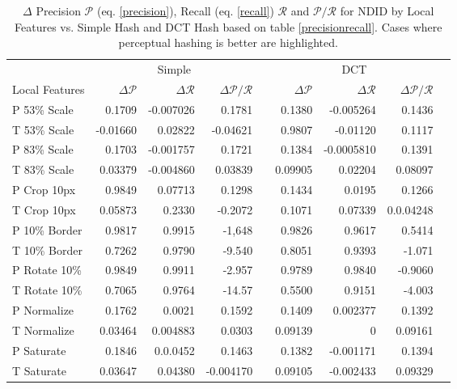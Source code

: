 \documentclass[english,12pt,a4paper,pdftex,elec,utf8, table]{aaltothesis}
\begin{document}
\begin{table} \footnotesize
\caption{ $\Delta$ Precision $\mathcal{P}$ (eq. \ref{precision}), Recall (eq. \ref{recall}) $\mathcal{R}$ and $\mathcal{P}/\mathcal{R}$ for NDID by Local Features vs. Simple Hash and DCT Hash based on table \ref{precisionrecall}. Cases where perceptual hashing is better are highlighted.}
\label{deltaprecisionrecall}
\begin{center}
  \setlength\tabcolsep{3pt} %
  \begin{tabular}{@{}lrrrrrrrr@{}}
    \toprule
    & \multicolumn{3}{c}{Simple} &\phantom{abc} &\multicolumn{3}{c}{DCT} &\phantom{abc}\\
\cmidrule{2-4} \cmidrule{6-8}
 Local Features & $\Delta \mathcal{P}$ & $\Delta \mathcal{R}$ & $\Delta \mathcal{P} / \mathcal{R}$ &\phantom{abc} & $\Delta \mathcal{P}$ & $\Delta \mathcal{R}$ & $\Delta \mathcal{P} / \mathcal{R}$ \\ \midrule
 P 53\% Scale   & 0.1709 & \cellcolor{blue!25}-0.007026  & 0.1781    &\phantom{abc} & 0.1380 & \cellcolor{blue!25}-0.005264 & 0.1436\\
 T 53\% Scale   & \cellcolor{blue!25}-0.01660 & 0.02822  & -0.04621  &\phantom{abc} & 0.9807 & \cellcolor{blue!25}-0.01120 & 0.1117\\
 P 83\% Scale   & 0.1703  & \cellcolor{blue!25}-0.001757 & 0.1721    &\phantom{abc} & 0.1384 & \cellcolor{blue!25}-0.0005810 & 0.1391\\
 T 83\% Scale   & 0.03379 & \cellcolor{blue!25}-0.004860 & 0.03839   &\phantom{abc} & 0.09905 & 0.02204 & 0.08097\\
 P Crop 10px    & 0.9849  & 0.07713   & 0.1298    &\phantom{abc} & 0.1434 & 0.0195 & 0.1266\\
 T Crop 10px    & 0.05873 & 0.2330    & -0.2072   &\phantom{abc} & 0.1071 & 0.07339 & 0.0.04248\\
 P 10\% Border  & 0.9817  & 0.9915    & -1,648    &\phantom{abc} & 0.9826 & 0.9617 & 0.5414\\
 T 10\% Border  & 0.7262  & 0.9790    & -9.540    &\phantom{abc} & 0.8051 & 0.9393 & -1.071\\
 P Rotate 10\%  & 0.9849  & 0.9911    & -2.957    &\phantom{abc} & 0.9789 & 0.9840 & -0.9060 \\
 T Rotate 10\%  & 0.7065  & 0.9764    & -14.57    &\phantom{abc} & 0.5500 & 0.9151 & -4.003 \\
 P Normalize    & 0.1762  & 0.0021    & 0.1592    &\phantom{abc} & 0.1409 & 0.002377 & 0.1392 \\
 T Normalize    & 0.03464 & 0.004883  & 0.0303    &\phantom{abc} & 0.09139 & 0 & 0.09161\\
 P Saturate     & 0.1846  & 0.0.0452  & 0.1463    &\phantom{abc} & 0.1382 & \cellcolor{blue!25}-0.001171 & 0.1394\\
 T Saturate     & 0.03647 & 0.04380   & -0.004170 &\phantom{abc} & 0.09105 & \cellcolor{blue!25}-0.002433 & 0.09329 \\
    \bottomrule
\end{tabular}
\end{center}\end{table}
\end{document}
